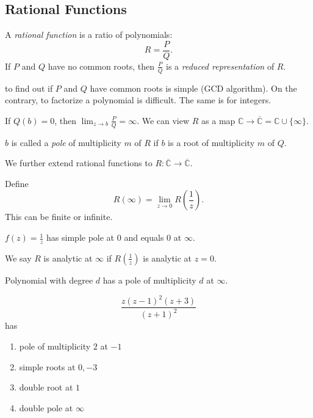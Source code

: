 \subsection{Rational Functions}

\begin{definition}
	A \textit{rational function} is a ratio of polynomials: \[
		R = \frac{P}{Q}
	.\] 
	If $P$ and $Q$ have no common roots, then $\frac{P}{Q}$ is a \textit{reduced representation} of $R$.
\end{definition}

\begin{remark}
	to find out if $P$ and $Q$ have common roots is simple (GCD algorithm). On the contrary, to factorize a polynomial is difficult. The same is for integers.
\end{remark}

If $Q(b) = 0$, then $\lim_{z \to b} \frac{P}{Q} = \infty $. We can view $R$ as a map $\mathbb{C} \to \overline{\mathbb{C}} = \mathbb{C}\cup \{\infty \}  $.

$b$ is called a  \textit{pole} of multiplicity $m$ of $R$ if $b$ is a root of multiplicity $m$ of $Q$.

We further extend rational functions to $R:\overline{\mathbb{C}} \to \overline{\mathbb{C}} $.

Define \[
	R(\infty ) = \lim_{z  \to 0} R(\frac{1}{z})
.\] This can be finite or infinite.

\begin{example}
	$f(z) = \frac{1}{z} $ has simple pole at $0$ and equals $0$ at $\infty $.
\end{example}

\begin{definition}
	We say $R$ is analytic at $\infty $ if $R(\frac{1}{z})$ is analytic at $z=0$.
\end{definition}

\begin{example}
	Polynomial with degree $d$ has a pole of multiplicity $d$ at $\infty $.
\end{example}

\begin{example}
	\[
		\frac{z(z-1)^2(z+3)}{(z+1)^2}
	\]
	has 
	\begin{enumerate}
		\item pole of multiplicity $2$ at $-1$ 
		\item simple roots at $0, -3$ 
		\item double root at $1$ 
		\item double pole at $\infty $
	\end{enumerate}
\end{example}
